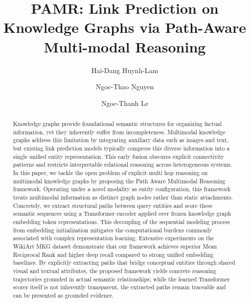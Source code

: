 \documentclass[runningheads]{llncs}
\begin{document}
%
\title{PAMR: Link Prediction on Knowledge Graphs via Path-Aware Multi-modal Reasoning}
%
%
\author{Hai-Dang Huynh-Lam \and
  Ngoc-Thao Nguyen
  \and
Ngoc-Thanh Le}
%
%
%
\maketitle  %
%
\begin{abstract}
  Knowledge graphs provide foundational semantic structures for organizing factual information, yet they inherently suffer from incompleteness. Multimodal knowledge graphs address this limitation by integrating auxiliary data such as images and text, but existing link prediction models typically compress this diverse information into a single unified entity representation. This early fusion obscures explicit connectivity patterns and restricts interpretable relational reasoning across heterogeneous systems. In this paper, we tackle the open problem of explicit multi hop reasoning on multimodal knowledge graphs by proposing the Path Aware Multimodal Reasoning framework. Operating under a novel modality as entity configuration, this framework treats multimodal information as distinct graph nodes rather than static attachments. Concretely, we extract structural paths between query entities and score these semantic sequences using a Transformer encoder applied over frozen knowledge graph embedding token representations. This decoupling of the sequential modeling process from embedding initialization mitigates the computational burdens commonly associated with complex representation learning. Extensive experiments on the WikiArt MKG dataset demonstrate that our framework achieves superior Mean Reciprocal Rank and higher deep recall compared to strong unified embedding baselines. By explicitly extracting paths that bridge conceptual entities through shared visual and textual attributes, the proposed framework yields concrete reasoning trajectories grounded in actual semantic relationships; while the learned Transformer scorer itself is not inherently transparent, the extracted paths remain traceable and can be presented as grounded evidence.

\end{abstract}
%
%
%
\end{document}
